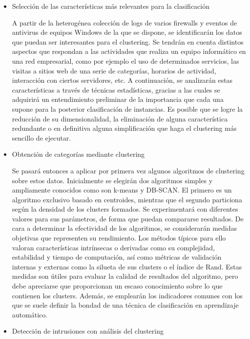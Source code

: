 \begin{itemize}

    \item Selección de las características más relevantes para la clasificación

A partir de la heterogénea colección de logs de varios firewalls y eventos de antivirus de equipos Windows de la que se dispone, se identificarán los datos que puedan ser interesantes para el clustering.
Se tendrán en cuenta distintos aspectos que respondan a las actividades que realiza un equipo informático en una red empresarial, como por ejemplo el uso de determinados servicios, las visitas a sitios web de una serie de categorías, horarios de actividad, interacción con ciertos servidores, etc.
A continuación, se analizarán estas características a través de técnicas estadísticas, gracias a las cuales se adquirirá un entendimiento preliminar de la importancia que cada una supone para la posterior clasificación de instancias.
Es posible que se logre la reducción de su dimensionalidad, la eliminación de alguna característica redundante o en definitiva alguna simplificación que haga el clustering más sencillo de ejecutar.

    \item Obtención de categorías mediante clustering

Se pasará entonces a aplicar por primera vez algunos algoritmos de clustering sobre estos datos.
Inicialmente se elegirán dos algoritmos simples y ampliamente conocidos como son k-means y DB-SCAN.
El primero es un algoritmo exclusivo basado en centroides, mientras que el segundo particiona según la densidad de los clusters formados.
Se experimentará con diferentes valores para sus parámetros, de forma que puedan compararse resultados.
De cara a determinar la efectividad de los algoritmos, se considerarán medidas objetivas que representen su rendimiento.
Los métodos típicos para ello valoran características intrínsecas o derivadas como su complejidad, estabilidad y tiempo de computación, así como métricas de validación internas y externas como la silueta de sus clusters o el índice de Rand.
Estas medidas son útiles para evaluar la calidad de resultados del algoritmo, pero debe apreciarse que proporcionan un escaso conocimiento sobre lo que contienen los clusters.
Además, se emplearán los indicadores comunes con los que se suele definir la bondad de una técnica de clasificación en aprendizaje automático.

    \item Detección de intrusiones con análisis del clustering


\end{itemize}
